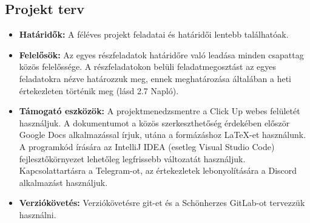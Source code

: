 
\subsection{Projekt terv}

\begin{itemize}
	\item[] \textbf{Határidők:} A féléves projekt feladatai és határidői lentebb találhatóak.
	\item[] \textbf{Felelősök:} Az egyes részfeladatok határidőre való leadása minden csapattag közös felelőssége. A részfeladatokon belüli feladatmegosztást az egyes feladatokra nézve határozzuk meg, ennek meghatározása általában a heti értekezleten történik meg (lásd 2.7 Napló).
	\item[] \textbf{Támogató eszközök:} A projektmenedzsmentre a Click Up webes felületét használjuk. A dokumentumot a közös szerkeszthetőség érdekében először Google Docs alkalmazással írjuk, utána a formázáshoz \LaTeX-et használunk. A programkód írására az IntelliJ IDEA (esetleg Visual Studio Code) fejlesztőkörnyezet lehetőleg legfrissebb változatát használjuk. Kapcsolattartásra a Telegram-ot, az értekezletek lebonyolítására a Discord alkalmazást használjuk.
	\item[] \textbf{Verziókövetés:} Verziókövetésre git-et és a Schönherzes GitLab-ot tervezzük használni.
\end{itemize}


